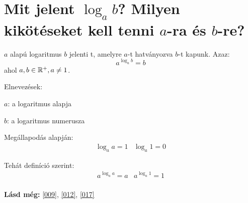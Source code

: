 
\section{Mit jelent \texorpdfstring{$\log_{a}b$}{log\textunderscore{}a(b)}? 
Milyen kikötéseket kell tenni \texorpdfstring{$a$}{a}-ra és
\texorpdfstring{$b$}{b}-re?}
\label{016}

\begin{defin}[Logaritmus]
\label{def:log}
$a$ alapú logaritmus $b$ jelenti t, amelyre $a$-t
hatványozva $b$-t kapunk. Azaz:
\[
  a^{\log_{a}b} = b
\]
ahol $a, b \in \mathbb{R}^+, a \neq 1$.

Elnevezések:

$a$: a logaritmus alapja

$b$: a logaritmus numerusza
\end{defin}

Megállapodás alapján:
\[
  \begin{array}{lr}
    \log_{a}a = 1 & \log_{a}1 = 0
  \end{array}
\]

Tehát definíció szerint:
\[
  \begin{array}{lr}
    a^{\log_{a}a} = a & a^{\log_{a}1} = 1\\
  \end{array}
\]

\textbf{Lásd még:} \ref{009}, \ref{012}, \ref{017}
